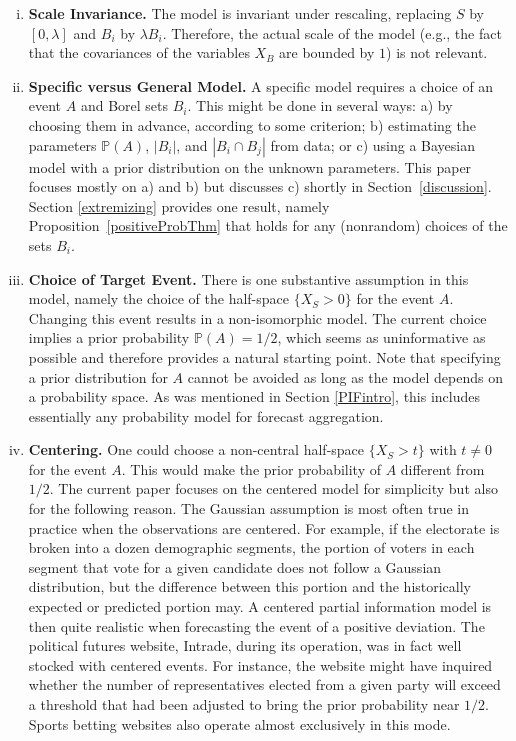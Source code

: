 \documentclass[12pt]{article}
\renewcommand{\P}{\mathbb{P}}
\theoremstyle{definition}
\theoremstyle{definition}
\def\P{{\mathbb P}}
\begin{document}
\begin{enumerate}[(i)]
\item {\bf Scale Invariance.} The model is invariant under rescaling,
replacing $S$ by $[0,\lambda]$ and $B_i$ by $\lambda B_i$.  Therefore,
the actual scale of the model (e.g., the fact that the covariances of
the variables $X_B$ are bounded by $1$) is not relevant.


\item {\bf Specific versus General Model.} A specific model requires a
choice of an event $A$ and Borel sets $B_i$.
This might be done in several ways: a) by choosing them in advance,
according to some criterion; b) estimating the parameters $\P(A)$,
$|B_i|$, and $|B_i \cap B_j|$ from data; or c) using a Bayesian model
with a prior distribution on the unknown parameters.  This paper
focuses mostly on a) and b) but discusses c) shortly in
Section~\ref{discussion}.  Section \ref{extremizing} provides one
result, namely Proposition~\ref{positiveProbThm} that holds for any (nonrandom) choices of the sets $B_i$.
\label{item:specific}






\item {\bf Choice of Target Event.}  There is one substantive
assumption in this model, namely the choice of the half-space $\{ X_S
> 0 \}$ for the event $A$.  Changing this event results
in a non-isomorphic model. The current choice
implies a prior probability $\P(A) = 1/2$, which seems as
uninformative as possible and therefore provides a natural starting
point. Note that specifying a prior distribution for $A$ cannot be avoided as
long as the model depends on a probability space. As was mentioned in
Section \ref{PIFintro}, this includes essentially any probability
model for forecast aggregation.
\label{item:choice}

\item {\bf Centering.} One could choose a non-central half-space $\{
X_S > t \}$ with $t \neq 0$ for the event $A$.  This would make the prior
probability of $A$ different from $1/2$.  The current paper focuses on the
centered model for simplicity but also for the following reason.  The
Gaussian assumption is most often true in practice when the
observations are centered.  For example, if the electorate
is broken into a dozen demographic segments, the portion of voters in
each segment that vote for a given candidate does not follow a
Gaussian distribution, but the difference between this portion and the
historically expected or predicted portion may.  A centered partial
information model is then quite realistic when forecasting the event
of a positive deviation.  The political futures website, Intrade,
during its operation, was in fact well stocked with centered events. For instance, the website might have inquired whether 
 the number of representatives elected from a
given party will exceed a threshold that had been adjusted to
bring the prior probability near $1/2$.  Sports betting websites also operate
almost exclusively in this mode.
\label{item:centered}
\end{enumerate}
\end{document}
